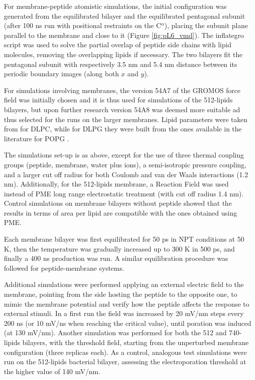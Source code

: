 For membrane-peptide atomistic simulations, the initial configuration was generated from the equilibrated bilayer and the equilibrated pentagonal subunit (after 100 ns run with positional restraints on the C$^\alpha$), placing the subunit plane parallel to the membrane and close to it (Figure \ref{fig:pL6_vmd}).
%
The inflategro script \citep{Kandt2007} was used to solve the partial overlap of peptide side chains with lipid molecules, removing the overlapping lipids if necessary.
%
The two bilayers fit the pentagonal subunit with respectively 3.5 nm and 5.4 nm distance between its periodic boundary images (along both $x$ and $y$).

For simulations involving membranes, the version 54A7 of the GROMOS force field \citep{Schmid2011} was initially chosen and it is thus used for simulations of the 512-lipids bilayers, but upon further research version 54A8 \citep{Oostenbrink2005, Reif2013} was deemed more suitable ad thus selected for the runs on the larger membranes. Lipid parameters were taken from \citep{PogerOrig} for DLPC, while for DLPG they were built from the ones available in the literature for POPG \citep{Kukol2009}.

The simulations set-up is as above, except for the use of three thermal coupling groups (peptide, membrane, water plus ions), a semi-isotropic pressure coupling, and a larger cut off radius for both Coulomb and van der Waals interactions (1.2 nm). Additionally, for the 512-lipids membrane, a Reaction Field \citep{Tironi1995} was used instead of PME long range electrostatic treatment (with cut off radius 1.4 nm). Control simulations on membrane bilayers without peptide showed that the results in terms of area per lipid are compatible with the ones obtained using PME.

Each membrane bilayer was first equilibrated for 50 ps in NPT conditions at 50 K, then the temperature was gradually increased up to 300 K in 500 ps, and finally a 400 ns production was run. A similar equilibration procedure was followed for peptide-membrane systems.

Additional simulations were performed applying an external electric field to the membrane, pointing from the side hosting the peptide to the opposite one, to mimic the membrane potential and verify how the peptide affects the response to external stimuli.
%
In a first run the field was increased by 20 mV/nm steps every 200 ns (or 10 mV/ns when reaching the critical value), until poration was induced (at 130 mV/nm).
%
Another simulation was performed for both the 512 and 740-lipids bilayers, with the threshold field, starting from the unperturbed membrane configuration (three replicas each).
%
As a control, analogous test simulations were run on the 512-lipids bacterial bilayer, assessing the electroporation threshold at the higher value of 140 mV/nm.

